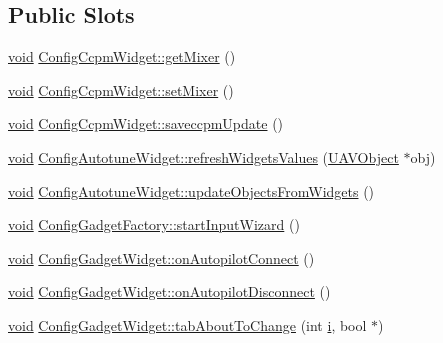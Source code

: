 \subsection*{\-Public \-Slots}
\begin{DoxyCompactItemize}
\item 
\hyperlink{group___u_a_v_objects_plugin_ga444cf2ff3f0ecbe028adce838d373f5c}{void} \hyperlink{group___config_plugin_ga655f5771884dcc4da79423c9f233ccca}{\-Config\-Ccpm\-Widget\-::get\-Mixer} ()
\item 
\hyperlink{group___u_a_v_objects_plugin_ga444cf2ff3f0ecbe028adce838d373f5c}{void} \hyperlink{group___config_plugin_gabc1d25c95203b38337f954ed47387039}{\-Config\-Ccpm\-Widget\-::set\-Mixer} ()
\item 
\hyperlink{group___u_a_v_objects_plugin_ga444cf2ff3f0ecbe028adce838d373f5c}{void} \hyperlink{group___config_plugin_ga58b70d2303d5485482abdd35f2f49c15}{\-Config\-Ccpm\-Widget\-::saveccpm\-Update} ()
\item 
\hyperlink{group___u_a_v_objects_plugin_ga444cf2ff3f0ecbe028adce838d373f5c}{void} \hyperlink{group___config_plugin_ga7a345485561483fc0d3252acc34f65cd}{\-Config\-Autotune\-Widget\-::refresh\-Widgets\-Values} (\hyperlink{class_u_a_v_object}{\-U\-A\-V\-Object} $\ast$obj)
\item 
\hyperlink{group___u_a_v_objects_plugin_ga444cf2ff3f0ecbe028adce838d373f5c}{void} \hyperlink{group___config_plugin_ga20c0a1a9487c7f461a6ea095fac93098}{\-Config\-Autotune\-Widget\-::update\-Objects\-From\-Widgets} ()
\item 
\hyperlink{group___u_a_v_objects_plugin_ga444cf2ff3f0ecbe028adce838d373f5c}{void} \hyperlink{group___config_plugin_ga12d479e09d53195a2226e61b1690124f}{\-Config\-Gadget\-Factory\-::start\-Input\-Wizard} ()
\item 
\hyperlink{group___u_a_v_objects_plugin_ga444cf2ff3f0ecbe028adce838d373f5c}{void} \hyperlink{group___config_plugin_ga4f8e913d92b646252bb6d82dfd028c52}{\-Config\-Gadget\-Widget\-::on\-Autopilot\-Connect} ()
\item 
\hyperlink{group___u_a_v_objects_plugin_ga444cf2ff3f0ecbe028adce838d373f5c}{void} \hyperlink{group___config_plugin_gaa57c964c58914d045daa972b9a1b87ce}{\-Config\-Gadget\-Widget\-::on\-Autopilot\-Disconnect} ()
\item 
\hyperlink{group___u_a_v_objects_plugin_ga444cf2ff3f0ecbe028adce838d373f5c}{void} \hyperlink{group___config_plugin_ga280d7130ca08f8974292483f6b017d72}{\-Config\-Gadget\-Widget\-::tab\-About\-To\-Change} (int \hyperlink{uavobjecttemplate_8m_a6f6ccfcf58b31cb6412107d9d5281426}{i}, bool $\ast$)

\end{DoxyCompactItemize}
